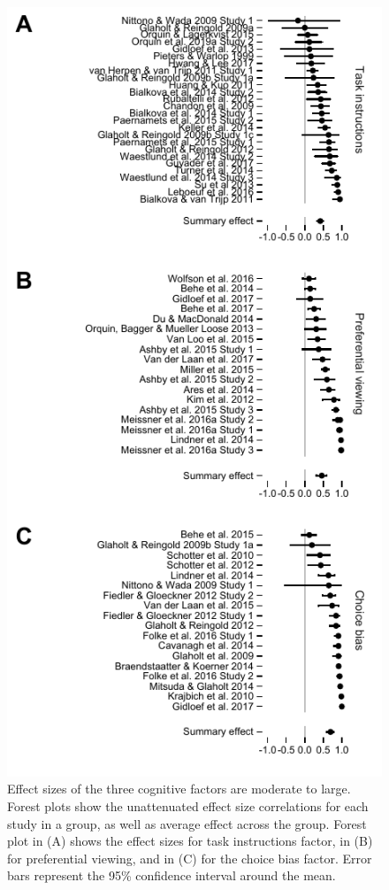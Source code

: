 \documentclass[english,natbib,man,floatsintext]{apa6}
\begin{document}
\begin{figure}[h]
\includegraphics{forest_plots_cognitive}
\centering
\caption{Effect sizes of the three cognitive factors are moderate to large. Forest plots show the unattenuated effect size correlations for each study in a group, as well as average effect across the group. Forest plot in (A) shows the effect sizes for task instructions factor, in (B) for preferential viewing, and in (C) for the choice bias factor. Error bars represent the 95\% confidence interval around the mean.}
\label{fig:forest_plots_cognitive}
\end{figure}
\end{document}

